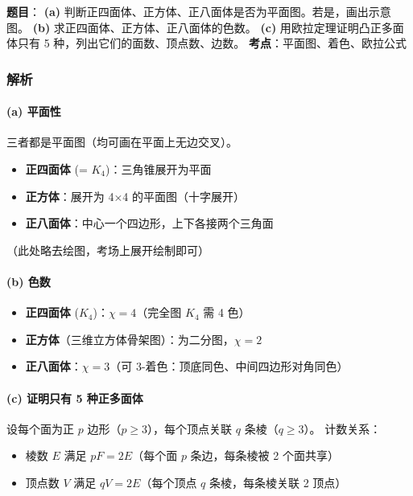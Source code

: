 \documentclass[10pt,a4paper,openany]{ctexbook}
\theoremstyle{definition}
\theoremstyle{remark}
\begin{document}
\textbf{题目}：
\textbf{(a)} 判断正四面体、正方体、正八面体是否为平面图。若是，画出示意图。
\textbf{(b)} 求正四面体、正方体、正八面体的色数。
\textbf{(c)} 用欧拉定理证明凸正多面体只有 5 种，列出它们的面数、顶点数、边数。
\textbf{考点}：平面图、着色、欧拉公式
\subsubsection{解析}

\paragraph{(a) 平面性}

三者都是平面图（均可画在平面上无边交叉）。
\begin{itemize}
\item \textbf{正四面体} (= $K_4$)：三角锥展开为平面
\item \textbf{正方体}：展开为 4×4 的平面图（十字展开）
\item \textbf{正八面体}：中心一个四边形，上下各接两个三角面

\end{itemize}

（此处略去绘图，考场上展开绘制即可）
\paragraph{(b) 色数}

\begin{itemize}
\item \textbf{正四面体} ($K_4$)：$\chi = 4$（完全图 $K_4$ 需 4 色）
\item \textbf{正方体}（三维立方体骨架图）：为二分图，$\chi = 2$
\item \textbf{正八面体}：$\chi = 3$（可 3-着色：顶底同色、中间四边形对角同色）

\end{itemize}

\paragraph{(c) 证明只有 5 种正多面体}

设每个面为正 $p$ 边形（$p \ge 3$），每个顶点关联 $q$ 条棱（$q \ge 3$）。
计数关系：
\begin{itemize}
\item 棱数 $E$ 满足 $pF = 2E$（每个面 $p$ 条边，每条棱被 2 个面共享）
\item 顶点数 $V$ 满足 $qV = 2E$（每个顶点 $q$ 条棱，每条棱关联 2 顶点）

\end{itemize}
\end{document}
